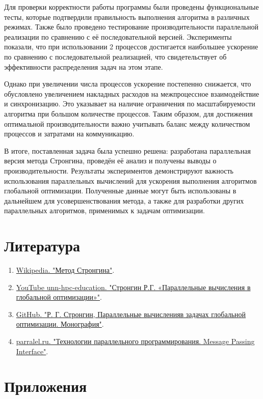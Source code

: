 \documentclass[a4paper,12pt]{article}
\begin{document}
Для проверки корректности работы программы были проведены функциональные тесты, которые подтвердили правильность выполнения алгоритма в различных режимах. Также было проведено тестирование производительности параллельной реализации по сравнению с её последовательной версией. Эксперименты показали, что при использовании 2 процессов достигается наибольшее ускорение по сравнению с последовательной реализацией, что свидетельствует об эффективности распределения задач на этом этапе.

Однако при увеличении числа процессов ускорение постепенно снижается, что обусловлено увеличением накладных расходов на межпроцессное взаимодействие и синхронизацию. Это указывает на наличие ограничения по масштабируемости алгоритма при большом количестве процессов. Таким образом, для достижения оптимальной производительности важно учитывать баланс между количеством процессов и затратами на коммуникацию.

В итоге, поставленная задача была успешно решена: разработана параллельная версия метода Стронгина, проведён её анализ и получены выводы о производительности. Результаты экспериментов демонстрируют важность использования параллельных вычислений для ускорения выполнения алгоритмов глобальной оптимизации. Полученные данные могут быть использованы в дальнейшем для усовершенствования метода, а также для разработки других параллельных алгоритмов, применимых к задачам оптимизации.

\section{Литература}
\begin{enumerate}
    \item \href{https://ru.wikipedia.org/wiki/Метод_Стронгина}{Wikipedia. "Метод Стронгина"}.
    \item \href{https://www.youtube.com/watch?v=5OwpGndiB04}{YouTube unn-hpc-education. "Стронгин Р.Г. «Параллельные вычисления в глобальной оптимизации»"}.
    \item \href{https://github.com/knightvmk/Global-Optimization/blob/master/Strongin.pdf}{GitHub. "Р. Г. Стронгин, Параллельные вычисленияв задачах глобальной оптимизации. Монография"}.
    \item \href{https://parallel.ru/vvv/mpi.html#p1}{parralel.ru. "Технологии параллельного программирования. Message Passing Interface"}.
\end{enumerate}

\section{Приложения}
\end{document}
